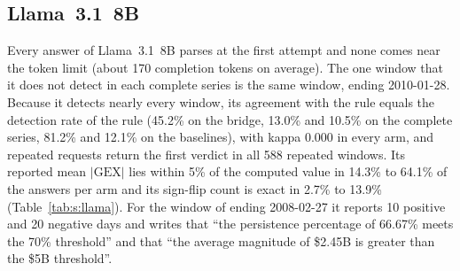 \subsection{Llama~3.1~8B}
\label{sec:s:open:llama}

Every answer of Llama~3.1~8B parses at the first attempt and none comes near the token limit (about 170 completion tokens on average). The one window that it does not detect in each complete series is the same window, ending 2010-01-28. Because it detects nearly every window, its agreement with the rule equals the detection rate of the rule (45.2\% on the bridge, 13.0\% and 10.5\% on the complete series, 81.2\% and 12.1\% on the baselines), with kappa 0.000 in every arm, and repeated requests return the first verdict in all 588 repeated windows. Its reported mean $|\mathrm{GEX}|$ lies within 5\% of the computed value in 14.3\% to 64.1\% of the answers per arm and its sign-flip count is exact in 2.7\% to 13.9\% (Table~\ref{tab:s:llama}). For the window of  ending 2008-02-27 it reports 10 positive and 20 negative days and writes that ``the persistence percentage of 66.67\% meets the 70\% threshold'' and that ``the average magnitude of \$2.45B is greater than the \$5B threshold''.

